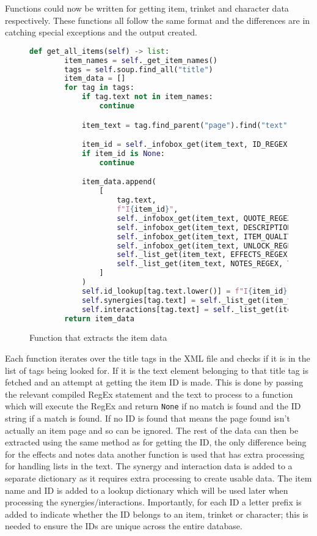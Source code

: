 Functions could now be written for getting item, trinket and character data respectively. These functions all follow the same format 
and the differences are in catching special exceptions and the output created.
\begin{figure}[!htbp]
    \begin{lstlisting}[language=Python]
        def get_all_items(self) -> list:
        item_names = self._get_item_names()
        tags = self.soup.find_all("title")
        item_data = []
        for tag in tags:
            if tag.text not in item_names:
                continue

            item_text = tag.find_parent("page").find("text").text

            item_id = self._infobox_get(item_text, ID_REGEX)
            if item_id is None:
                continue

            item_data.append(
                [
                    tag.text,
                    f"I{item_id}",
                    self._infobox_get(item_text, QUOTE_REGEX),
                    self._infobox_get(item_text, DESCRIPTION_REGEX),
                    self._infobox_get(item_text, ITEM_QUALITY_REGEX),
                    self._infobox_get(item_text, UNLOCK_REGEX),
                    self._list_get(item_text, EFFECTS_REGEX, True),
                    self._list_get(item_text, NOTES_REGEX, True),
                ]
            )
            self.id_lookup[tag.text.lower()] = f"I{item_id}"
            self.synergies[tag.text] = self._list_get(item_text, SYNERGIES_REGEX)
            self.interactions[tag.text] = self._list_get(item_text, INTERACTIONS_REGEX)
        return item_data
    \end{lstlisting}
    \caption{Function that extracts the item data}
\end{figure}
Each function iterates over the title tags in the XML file and checks if it is in the list of tags being looked for. 
If it is the text element belonging to that title tag is fetched and an attempt at getting the item ID is made. This is done 
by passing the relevant compiled RegEx statement and the text to process to a function which will execute the RegEx and return \verb|None| 
if no match is found and the ID string if a match is found. If no ID is found that means the page found isn't actually an item page and so can be ignored.
The rest of the data can then be extracted using the same method as for getting the ID, the only difference being for the effects and notes data another function 
is used that has extra processing for handling lists in the text. The synergy and interaction data is added to a separate dictionary as it requires extra processing 
to create usable data. The item name and ID is added to a lookup dictionary which will be used later when processing the synergies/interactions.
Importantly, for each ID a letter prefix is added to indicate whether the ID belongs to an item, trinket or character; this is needed to ensure the IDs 
are unique across the entire database.

